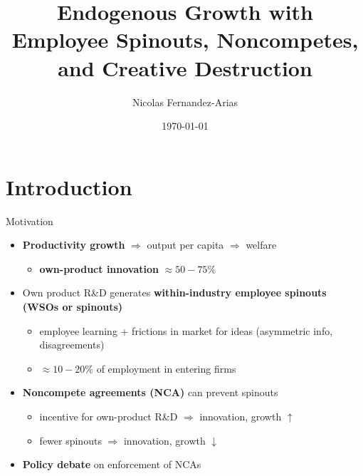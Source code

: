 \documentclass[english,usenames,dvipsnames]{beamer}
\title{Endogenous Growth with Employee Spinouts, Noncompetes, and Creative Destruction}
\author{Nicolas Fernandez-Arias}
\date{\today }
\begin{document}
\maketitle

\section{Introduction}

\begin{frame}{Motivation}\label{motivation_1}
	\begin{itemize}
		\item<+-> \alert{\textbf{Productivity growth}} $\Rightarrow$ output per capita $\Rightarrow$ welfare \hyperlink{economic_growth_facts}{}
		\begin{itemize}
			\item \alert{\textbf{own-product innovation}} $\approx 50-75\%$  \hyperlink{motivation:importanceofOI}{}
		\end{itemize}
		\medskip
		\item<+-> Own product R\&D generates \alert{\textbf{within-industry employee spinouts (WSOs or spinouts)}}
		\begin{itemize}
			\item employee learning + frictions in market for ideas (asymmetric info, disagreements) \hyperlink{motivation:importanceofOI}{}
			\item $\approx 10-20\%$ of employment in entering firms \hyperlink{motivation:importanceOfSpinouts}{}
		\end{itemize}
		\medskip
		\item<+-> \alert{\textbf{Noncompete agreements (NCA)}} can prevent spinouts \hyperlink{motivation:importanceOfNCAs}{} 
		\begin{itemize} 
			\item incentive for own-product R\&D $\Rightarrow$ innovation, growth $\uparrow$
			\item fewer spinouts $\Rightarrow$ innovation, growth $\downarrow$
		\end{itemize}
		\medskip
		\item<+-> \alert{\textbf{Policy debate}} on enforcement of NCAs \hyperlink{motivation:policyDebateOnNCAs}{}
	\end{itemize}
\end{frame}
\end{document}
